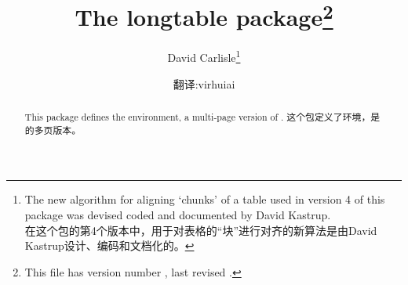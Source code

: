  \title{The \textsf{longtable} package\thanks{This file
       has version number \fileversion, last
       revised \filedate.}}
\author{David Carlisle\thanks{%
\noindent 
The new algorithm for aligning `chunks'
of a table used in version 4 of this package was devised coded
and documented by David Kastrup.\\
\hspace*{2em}在这个包的第4个版本中，用于对表格的“块”进行对齐的新算法是由David Kastrup设计、编码和文档化的。
}\and 翻译:virhuiai}
\date{\filedate}

\maketitle

\begin{abstract}
\begin{paracol}{2}
\noindent This package defines the  environment, a multi-page
version of .
\switchcolumn
这个包定义了环境，是的多页版本。
\end{paracol}
\end{abstract}